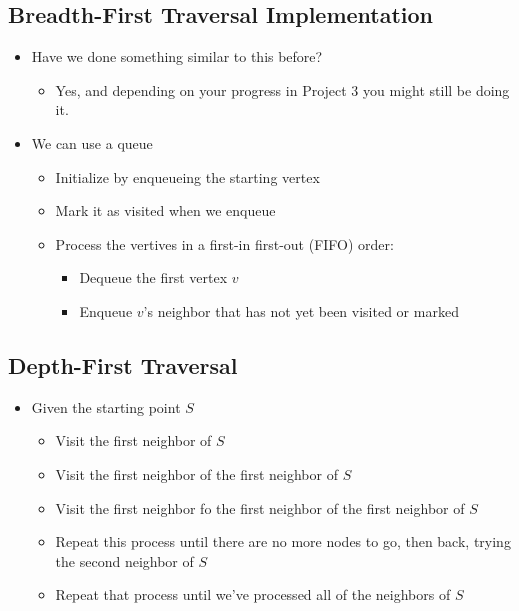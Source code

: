 \documentclass[
  10pt,
  english,
  letterpaper,
,tablecaptionabove
]{scrartcl}
\providecommand{\tightlist}{%
  \setlength{\itemsep}{0pt}\setlength{\parskip}{0pt}}
\begin{document}
\hypertarget{breadth-first-traversal-implementation}{%
\subsection{Breadth-First Traversal
Implementation}\label{breadth-first-traversal-implementation}}

\begin{itemize}
\tightlist
\item
  Have we done something similar to this before?

  \begin{itemize}
  \tightlist
  \item
    Yes, and depending on your progress in Project 3 you might still be
    doing it.
  \end{itemize}
\item
  We can use a queue

  \begin{itemize}
  \tightlist
  \item
    Initialize by enqueueing the starting vertex
  \item
    Mark it as visited when we enqueue
  \item
    Process the vertives in a first-in first-out (FIFO) order:

    \begin{itemize}
    \tightlist
    \item
      Dequeue the first vertex \(v\)
    \item
      Enqueue \(v\)'s neighbor that has not yet been visited or marked
    \end{itemize}
  \end{itemize}
\end{itemize}

\hypertarget{depth-first-traversal}{%
\subsection{Depth-First Traversal}\label{depth-first-traversal}}

\begin{itemize}
\tightlist
\item
  Given the starting point \(S\)

  \begin{itemize}
  \tightlist
  \item
    Visit the first neighbor of \(S\)
  \item
    Visit the first neighbor of the first neighbor of \(S\)
  \item
    Visit the first neighbor fo the first neighbor of the first neighbor
    of \(S\)
  \item
    Repeat this process until there are no more nodes to go, then back,
    trying the second neighbor of \(S\)
  \item
    Repeat that process until we've processed all of the neighbors of
    \(S\)
  \end{itemize}
\end{itemize}
\end{document}
